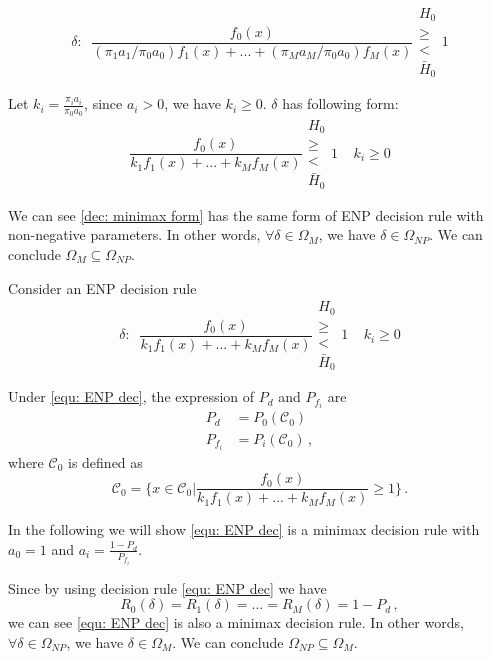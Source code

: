 \documentclass[12pt,journal,a4paper,twoside,onecolumn]{IEEEtran}
\begin{document}
\begin{spacing}{2.5}
\begin{equation}
\label{dec: delta}
\delta:\;\;\frac{f_0(x)}{(\pi_1a_1/\pi_0a_0)f_1(x) + ... +  (\pi_Ma_M/\pi_0a_0)f_M(x)} \substack{H_0 \\ \geq \\ < \\ \bar{H}_0} 1
\end{equation}

Let $k_i = \frac{\pi_ia_i}{\pi_0a_0}$,  since $a_i > 0$, we have $k_i \geq 0$. $\delta$ has following form:
\begin{equation}
\label{dec: minimax form}
\frac{f_0(x)}{k_1f_1(x) + ... + k_Mf_M(x)} \substack{H_0 \\ \geq \\ < \\ \bar{H}_0} 1\;\;\;\;k_i \geq 0
\end{equation}

We can see \eqref{dec: minimax form} has the same form of ENP decision rule with non-negative parameters. In other words, $\forall \delta \in \Omega_{M}$, we have $\delta \in \Omega_{NP}$. We can conclude $\Omega_{M} \subseteq \Omega_{NP}$.

Consider an ENP decision rule 
\begin{equation}
\label{equ: ENP dec}
\delta:\;\;\frac{f_0(x)}{k_1f_1(x) + ... + k_Mf_M(x)} \substack{H_0 \\ \geq \\ < \\ \bar{H}_0} 1\;\;\;\;k_i \geq 0
\end{equation}

Under \eqref{equ: ENP dec}, the expression of $P_d$ and $P_{f_i}$ are
\begin{equation}
\begin{split}
\label{mini: condition}
P_d &= P_0(\mathcal{C}_0)\\
P_{f_i} &= P_i(\mathcal{C}_0)\,,
\end{split}
\end{equation}
where $\mathcal{C}_0$ is defined as
\begin{equation}
\mathcal{C}_0 = \{ x \in \mathcal{C}_0 | \frac{f_0(x)}{k_1f_1(x) + ... + k_Mf_M(x)} \geq 1\}\,.
\end{equation}

In the following we will show \eqref{equ: ENP dec} is a minimax decision rule with  $a_0 = 1$ and $a_i = \frac{1-P_d}{P_{f_i}}$.  

Since by using decision rule \eqref{equ: ENP dec} we have 
\begin{equation}
\label{R0}
R_0(\delta) = R_1(\delta) = ... =  R_M(\delta) = 1- P_d\,,
\end{equation}
we can see \eqref{equ: ENP dec} is also a minimax decision rule. In other words, $\forall \delta \in \Omega_{NP}$, we have $\delta \in \Omega_{M}$. We can conclude $\Omega_{NP} \subseteq \Omega_{M}$.


\end{spacing}
\end{document}
